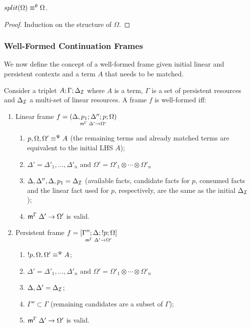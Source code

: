 \begin{theorem}
$\feqa{split(\Omega)}{\Omega}{\theta}{\theta}$.
\end{theorem}
\begin{proof}
Induction on the structure of $\Omega$.
\end{proof}

\subsubsection{Well-Formed Continuation Frames}

We now define the concept of a well-formed frame given initial linear and
persistent contexts and a term $A$ that needs to be matched.

\begin{definition}

Consider a triplet $A; \Gamma; \deltan$ where $A$ is a term, $\Gamma$ is a
set of persistent resources and $\deltan$ a multi-set of linear
resources. A frame $f$ is well-formed iff:

\begin{enumerate}[leftmargin=*]
   \item Linear frame $f = \lframe{\Delta,
      p_1}{\Delta''}{p}{\Omega}{\Delta'}{\Omega'}$

   \begin{enumerate}
      \item $\feqa{p, \Omega, \Omega'}{A}{\Psi}{\Psi}$ (the remaining terms and already
               matched terms are equivalent to the initial LHS $A$);
      \item $\Delta' = \Delta'_1, \dotsc, \Delta'_n$ and $\Omega' =
      \Omega'_1 \otimes \dotsb \otimes \Omega'_n$
      \item $\Delta, \Delta'', \Delta, p_1 = \deltan$ (available facts, candidate
            facts for $p$, consumed facts and the linear fact used for $p$,
            respectively, are the same as the initial $\deltan$);
      \item $\mz{\Gamma}{\Delta'}{\Omega'}$ is valid.

   \end{enumerate}
   \item Persistent frame $f = \pframe{\Gamma''}{\Delta}{\bang
   p}{\Omega}{\Delta'}{\Omega'}$
      \begin{enumerate}
         \item $\feqa{\bang p, \Omega, \Omega'}{A}{\Psi}{\Psi}$;
         \item $\Delta' = \Delta'_1, \dotsc, \Delta'_n$ and $\Omega' =
         \Omega'_1 \otimes \dotsb \otimes \Omega'_n$
         \item $\Delta, \Delta' = \deltan$;
         \item $\Gamma'' \subset \Gamma$ (remaining candidates are a subset of
                     $\Gamma$);
         \item $\mz{\Gamma}{\Delta'}{\Omega'}$ is valid.
      \end{enumerate}
\end{enumerate}
\end{definition}

